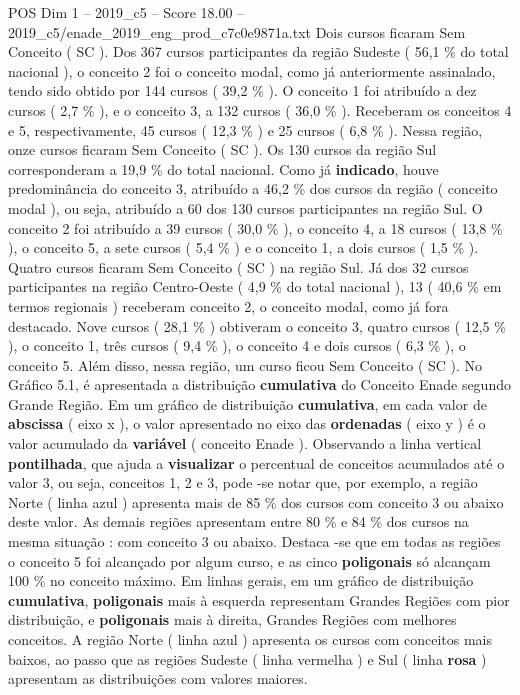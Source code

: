 \begin{textsample}{POS Dim 1 – 2019\_c5 – Score 18.00 – 2019\_c5/enade\_2019\_eng\_prod\_c7c0e9871a.txt}
Dois cursos ficaram Sem Conceito ( SC ).
Dos 367 cursos participantes da região Sudeste ( 56,1 \% do total nacional ), o conceito 2 foi o conceito modal, como já anteriormente assinalado, tendo sido obtido por 144 cursos ( 39,2 \% ).
O conceito 1 foi atribuído a dez cursos ( 2,7 \% ), e o conceito 3, a 132 cursos ( 36,0 \% ).
Receberam os conceitos 4 e 5, respectivamente, 45 cursos ( 12,3 \% ) e 25 cursos ( 6,8 \% ).
Nessa região, onze cursos ficaram Sem Conceito ( SC ).
Os 130 cursos da região Sul corresponderam a 19,9 \% do total nacional.
Como já \textbf{indicado}, houve predominância do conceito 3, atribuído a 46,2 \% dos cursos da região ( conceito modal ), ou seja, atribuído a 60 dos 130 cursos participantes na região Sul.
O conceito 2 foi atribuído a 39 cursos ( 30,0 \% ), o conceito 4, a 18 cursos ( 13,8 \% ), o conceito 5, a sete cursos ( 5,4 \% ) e o conceito 1, a dois cursos ( 1,5 \% ).
Quatro cursos ficaram Sem Conceito ( SC ) na região Sul.
Já dos 32 cursos participantes na região Centro-Oeste ( 4,9 \% do total nacional ), 13 ( 40,6 \% em termos regionais ) receberam conceito 2, o conceito modal, como já fora destacado.
Nove cursos ( 28,1 \% ) obtiveram o conceito 3, quatro cursos ( 12,5 \% ), o conceito 1, três cursos ( 9,4 \% ), o conceito 4 e dois cursos ( 6,3 \% ), o conceito 5.
Além disso, nessa região, um curso ficou Sem Conceito ( SC ).
No Gráfico 5.1, é apresentada a distribuição \textbf{cumulativa} do Conceito Enade segundo Grande Região.
Em um gráfico de distribuição \textbf{cumulativa}, em cada valor de \textbf{abscissa} ( eixo x ), o valor apresentado no eixo das \textbf{ordenadas} ( eixo y ) é o valor acumulado da \textbf{variável} ( conceito Enade ).
Observando a linha vertical \textbf{pontilhada}, que ajuda a \textbf{visualizar} o percentual de conceitos acumulados até o valor 3, ou seja, conceitos 1, 2 e 3, pode -se notar que, por exemplo, a região Norte ( linha azul ) apresenta mais de 85 \% dos cursos com conceito 3 ou abaixo deste valor.
As demais regiões apresentam entre 80 \% e 84 \% dos cursos na mesma situação : com conceito 3 ou abaixo.
Destaca -se que em todas as regiões o conceito 5 foi alcançado por algum curso, e as cinco \textbf{poligonais} só alcançam 100 \% no conceito máximo.
Em linhas gerais, em um gráfico de distribuição \textbf{cumulativa}, \textbf{poligonais} mais à esquerda representam Grandes Regiões com pior distribuição, e \textbf{poligonais} mais à direita, Grandes Regiões com melhores conceitos.
A região Norte ( linha azul ) apresenta os cursos com conceitos mais baixos, ao passo que as regiões Sudeste ( linha vermelha ) e Sul ( linha \textbf{rosa} ) apresentam as distribuições com valores maiores.

\end{textsample}
